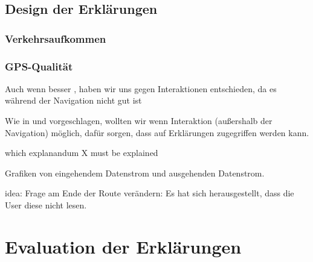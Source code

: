\subsection{Design der Erklärungen}

\subsubsection{Verkehrsaufkommen}
\label{06_model_evaluation:traffic_volume_definition}

\subsubsection{GPS-Qualität}
\label{06_model_evaluation:gps_accuracy_definition}

Auch wenn besser \cite{riveiro_thats_2021}, haben wir uns gegen Interaktionen entschieden, da es während der Navigation nicht gut ist

Wie in \cite{chazette_end-users_nodate} und \cite{wang_integration_2020} vorgeschlagen, wollten wir wenn Interaktion (außershalb der Navigation) möglich, dafür sorgen, dass auf Erklärungen zugegriffen werden kann.

which explanandum X must be explained \cite{kohl_explainability_2019}

Grafiken von eingehendem Datenstrom und ausgehenden Datenstrom.

idea: Frage am Ende der Route verändern: Es hat sich herausgestellt, dass die User diese nicht lesen.

\section{Evaluation der Erklärungen}





